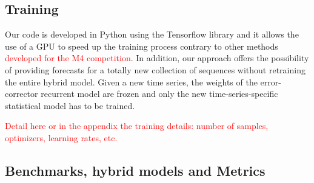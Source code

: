 \documentclass[letterpaper]{article} %
\begin{document}
\subsection{Training}

Our code is developed in Python using the Tensorflow library and it allows the use of a GPU to speed up the training process contrary to other methods \textcolor{red}{\cite{} developed for the M4 competition}. In addition, our approach offers the possibility of providing forecasts for a totally  new collection of sequences without retraining the entire hybrid model. Given a new time series,  the weights of the error-corrector recurrent model are frozen and only the new time-series-specific statistical model has to be trained.%


\textcolor{red}{Detail here or in the appendix the training details: number of samples, optimizers, learning rates, etc.}
\subsection{Benchmarks, hybrid models and Metrics}
\end{document}
